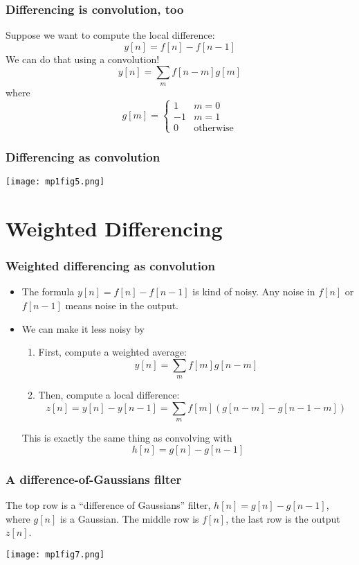 \documentclass{beamer}
\begin{document}
\begin{frame}
  \frametitle{Differencing is convolution, too}

  Suppose we want to compute the local difference:
  \[
  y[n] = f[n] - f[n-1]
  \]
  We can do that using a convolution!
  \[
  y[n] = \sum_m f[n-m]g[m]
  \]
  where
  \[
  g[m] = \begin{cases}
    1 & m=0\\
    -1 & m=1\\
    0 & \mbox{otherwise}
  \end{cases}
  \]
\end{frame}

\begin{frame}
  \frametitle{Differencing as convolution} 
  \centerline{\texttt{[image: mp1fig5.png]}}
\end{frame}
  
\section[Weighted]{Weighted Differencing}
\setcounter{subsection}{1}

\begin{frame}
  \frametitle{Weighted differencing as convolution}
  \begin{itemize}
    \item 
      The formula $y[n]=f[n]-f[n-1]$ is kind of noisy.  Any noise in
      $f[n]$ or $f[n-1]$ means noise in the output.
    \item
      We can make it less noisy  by
      \begin{enumerate}
      \item First, compute a weighted average:
        \[
        y[n] = \sum_m f[m]g[n-m]
        \]
      \item Then, compute a local difference:
        \[
        z[n] = y[n] - y[n-1] = \sum_m f[m]\left(g[n-m]-g[n-1-m]\right)
        \]
      \end{enumerate}
      This is exactly the same thing as convolving with
      \[
      h[n] = g[n]-g[n-1]
      \]
  \end{itemize}
\end{frame}

\begin{frame}
  \frametitle{A difference-of-Gaussians filter}

  The top row is a ``difference of Gaussians'' filter,
  $h[n]=g[n]-g[n-1]$, where $g[n]$ is a Gaussian.  The middle row is
  $f[n]$, the last row is the output $z[n]$.
  \centerline{\texttt{[image: mp1fig7.png]}}
\end{frame}
\end{document}
